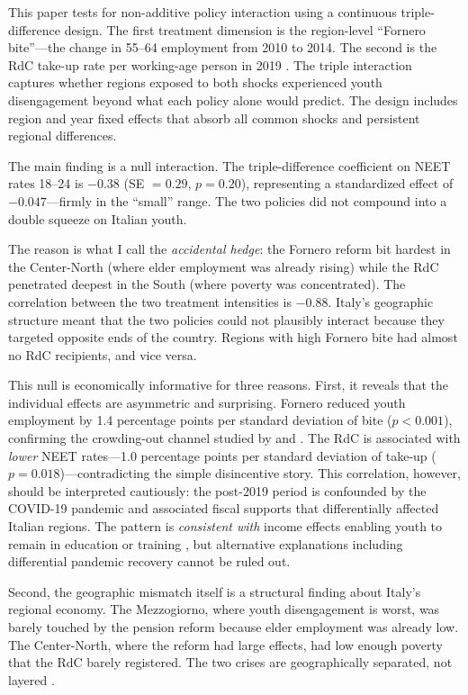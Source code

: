 \documentclass[12pt]{article}
\begin{document}
This paper tests for non-additive policy interaction using a continuous triple-difference design. The first treatment dimension is the region-level ``Fornero bite''---the change in 55--64 employment from 2010 to 2014. The second is the RdC take-up rate per working-age person in 2019 \citep{inps2019rdc}. The triple interaction captures whether regions exposed to both shocks experienced youth disengagement beyond what each policy alone would predict. The design includes region and year fixed effects that absorb all common shocks and persistent regional differences.

The main finding is a null interaction. The triple-difference coefficient on NEET rates 18--24 is $-0.38$ (SE $= 0.29$, $p = 0.20$), representing a standardized effect of $-0.047$---firmly in the ``small'' range. The two policies did not compound into a double squeeze on Italian youth.

The reason is what I call the \emph{accidental hedge}: the Fornero reform bit hardest in the Center-North (where elder employment was already rising) while the RdC penetrated deepest in the South (where poverty was concentrated). The correlation between the two treatment intensities is $-0.88$. Italy's geographic structure meant that the two policies could not plausibly interact because they targeted opposite ends of the country. Regions with high Fornero bite had almost no RdC recipients, and vice versa.

This null is economically informative for three reasons. First, it reveals that the individual effects are asymmetric and surprising. Fornero reduced youth employment by 1.4 percentage points per standard deviation of bite ($p < 0.001$), confirming the crowding-out channel studied by \citet{boeri2022} and \citet{bertoni2018}. The RdC is associated with \emph{lower} NEET rates---1.0 percentage points per standard deviation of take-up ($p = 0.018$)---contradicting the simple disincentive story. This correlation, however, should be interpreted cautiously: the post-2019 period is confounded by the COVID-19 pandemic and associated fiscal supports that differentially affected Italian regions. The pattern is \emph{consistent with} income effects enabling youth to remain in education or training \citep{ferrante2023, ferrara2022}, but alternative explanations including differential pandemic recovery cannot be ruled out.

Second, the geographic mismatch itself is a structural finding about Italy's regional economy. The Mezzogiorno, where youth disengagement is worst, was barely touched by the pension reform because elder employment was already low. The Center-North, where the reform had large effects, had low enough poverty that the RdC barely registered. The two crises are geographically separated, not layered \citep{ferrante2023}.
\end{document}
